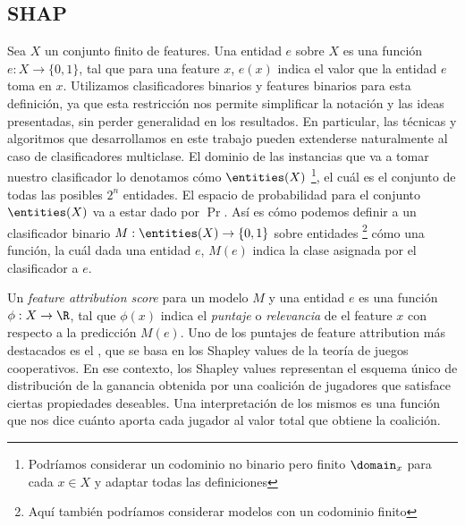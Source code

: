 \begin{comment}
    SHAP
    Complejidad de SHAP
        Resultados previos
        ASV + Grafo Causal y Toposorts
        Nuestro objetivo era calcular ASV en tiempo polinomial en Árboles de Decisión
\end{comment}

\subsection{SHAP}


Sea $X$ un conjunto finito de features. Una entidad $e$ sobre $X$ es una función $e: X \to \{0,1\}$, tal que para una feature $x$, $e(x)$ indica el valor que la entidad $e$ toma en $x$. Utilizamos clasificadores binarios y features binarios para esta definición, ya que esta restricción nos permite simplificar la notación y las ideas presentadas, sin perder generalidad en los resultados. En particular, las técnicas y algoritmos que desarrollamos en este trabajo pueden extenderse naturalmente al caso de clasificadores multiclase. El dominio de las instancias que va a tomar nuestro clasificador lo denotamos cómo $\entities(X)$ \footnote{Podríamos considerar un codominio no binario pero finito $\domain_x$ para cada $x \in X$ y adaptar todas las definiciones}, el cuál es el conjunto de todas las posibles $2^n$ entidades. El espacio de probabilidad para el conjunto \(\entities(X)\) va a estar dado por \(\Pr\). Así es cómo podemos definir a un clasificador binario $M: \entities(X) \to \{0,1\}$ sobre entidades \footnote{Aquí también podríamos considerar modelos con un codominio finito} cómo una función, la cuál dada una entidad $e$, $M(e)$ indica la clase asignada por el clasificador a $e$. %

Un \textit{feature attribution score} para un modelo $M$ y una entidad $e$ es una función $\phi : X \to \R$, tal que $\phi(x)$ indica el \textit{puntaje} o \textit{relevancia} de el feature $x$ con respecto a la predicción $M(e)$. Uno de los puntajes de feature attribution más destacados es el \SHAPscore{} \cite{shapOriginalPaper}, que se basa en los Shapley values \cite{shapley1953value} de la teoría de juegos cooperativos. En ese contexto, los Shapley values representan el esquema único de distribución de la ganancia obtenida por una coalición de jugadores que satisface ciertas propiedades deseables. Una interpretación de los mismos es una función que nos dice cuánto aporta cada jugador al valor total que obtiene la coalición. %

